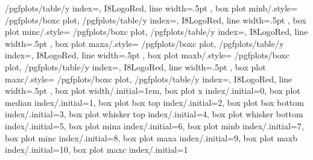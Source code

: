 {{		/pgfplots/table/y index=,
		I8LogoRed,
		line width=.5pt
	},
	box plot minb/.style={
		/pgfplots/boxc plot,
		/pgfplots/table/y index=,
		I8LogoRed,
		line width=.5pt
	},
	box plot minc/.style={
		/pgfplots/boxc plot,
		/pgfplots/table/y index=,
		I8LogoRed,
		line width=.5pt
	},
	box plot maxa/.style={
		/pgfplots/boxc plot,
		/pgfplots/table/y index=,
		I8LogoRed,
		line width=.5pt
	},
	box plot maxb/.style={
		/pgfplots/boxc plot,
		/pgfplots/table/y index=,
		I8LogoRed,
		line width=.5pt
	},
	box plot maxc/.style={
		/pgfplots/boxc plot,
		/pgfplots/table/y index=,
		I8LogoRed,
		line width=.5pt
	},
	box plot width/.initial=1em,
	box plot x index/.initial=0,
	box plot median index/.initial=1,
	box plot box top index/.initial=2,
	box plot box bottom index/.initial=3,
	box plot whisker top index/.initial=4,
	box plot whisker bottom index/.initial=5,
	box plot mina index/.initial=6,
	box plot minb index/.initial=7,
	box plot minc index/.initial=8,
	box plot maxa index/.initial=9,
	box plot maxb index/.initial=10,
	box plot maxc index/.initial=1
}

\newcommand{\boxplot}[2][]{
	\addplot [box plot median,#1] table {#2};
	\addplot [forget plot, box plot top whisker,#1] table {#2};
	\addplot [forget plot, box plot bottom whisker,#1] table {#2};
	\addplot [forget plot, box plot box,#1] table {#2};
}

